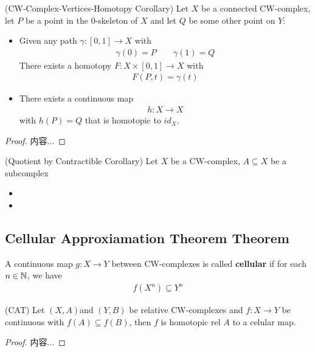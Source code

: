 \documentclass[Total.tex]{subfiles}
\begin{document}
		\begin{corollary}
			(CW-Complex-Vertices-Homotopy Corollary) Let $X$ be a connected CW-complex, let $P$ be a point in the $0$-skeleton of $X$ and let $Q$ be some other point on $Y$:
			\begin{itemize}
				\item Given any path $\gamma:[0,1]\rightarrow X$ with
				\begin{gather*}
					\gamma(0)=P\qquad \gamma(1)=Q
				\end{gather*}
				There exists a homotopy $F:X\times [0,1]\rightarrow X$ with
				\begin{gather*}
					F(P,t)=\gamma(t)
				\end{gather*}
				\item There exists a continuous map
				\begin{gather*}
					h:X \rightarrow X
				\end{gather*}
				with $h(P)=Q$ that is homotopic to $id_X$.
			\end{itemize}
		\end{corollary}
		\begin{proof}
			内容...
		\end{proof}
		
		\begin{corollary}
			(Quotient by Contractible Corollary) Let $X$ be a CW-complex, $A\subseteq X$ be a subcomplex
			\begin{itemize}
				\item 
				\item 
			\end{itemize}
		\end{corollary}
	\subsection{Cellular Approxiamation Theorem Theorem}
		\begin{Def}
			A continuous map $g:X\rightarrow Y$ between CW-complexes is called \textbf{cellular} if for each $n\in \mathbb{N}$, we have
			\begin{gather*}
				f(X^n)\subseteq Y^n
			\end{gather*}
		\end{Def}
		
		\begin{theorem}
			(CAT) Let $(X,A)$and $(Y,B)$ be relative CW-complexes and $f:X\rightarrow Y$ be continuous with $f(A)\subseteq f(B)$, then $f$ is homotopic rel $A$ 
			to a celular map.
		\end{theorem}
		\begin{proof}
			内容...
		\end{proof}
\end{document}
